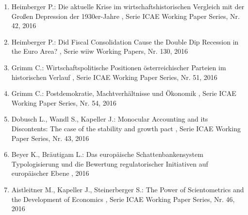 \begin{enumerate}[leftmargin=*, labelsep=0.5cm]
	 \item Heimberger P.:  Die aktuelle Krise im wirtschaftshistorischen Vergleich mit der Großen Depression der 1930er-Jahre  , Serie ICAE Working Paper Series, Nr. 42, 2016
	 \item Heimberger P.:  Did Fiscal Consolidation Cause the Double Dip Recession in the Euro Area?  , Serie wiiw Working Papers, Nr. 130, 2016
	 \item Grimm C.:  Wirtschaftspolitische Positionen österreichischer Parteien im historischen Verlauf  , Serie ICAE Working Paper Series, Nr. 51, 2016
	 \item Grimm C.:  Postdemokratie, Machtverhältnisse und Ökonomik  , Serie ICAE Working Paper Series, Nr. 54, 2016
	 \item Dobusch L., Wandl S., Kapeller J.:  Monocular Accounting and its Discontents: The case of the stability and growth pact  , Serie ICAE Working Paper Series, Nr. 43, 2016
	 \item Beyer K., Bräutigam L.:  Das europäische Schattenbankensystem Typologisierung und die Bewertung regulatorischer Initiativen auf europäischer Ebene  , 2016
	 \item Aistleitner M., Kapeller J., Steinerberger S.:  The Power of Scientometrics and the Development of Economics  , Serie ICAE Working Paper Series, Nr. 46, 2016
\end{enumerate} 
